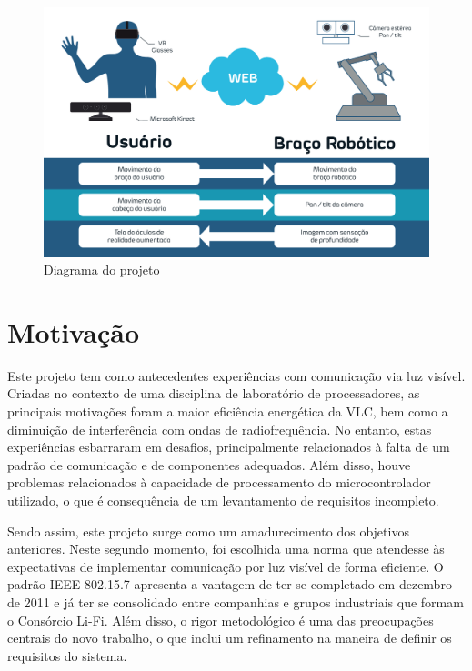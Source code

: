 	 
	
	
	
	
	\begin{figure}[ht!]
		\caption{\label{fig_diagrama}Diagrama do projeto}
		\begin{center}
		\includegraphics[width=\textwidth]{projectchart.pdf}	
		\end{center}
	\end{figure}
	

	
	\section*{Motivação}\label{sec-motivacao}
	
	Este projeto tem como antecedentes experiências com comunicação via luz visível. Criadas no contexto de uma disciplina de laboratório de processadores, as principais motivações foram a maior eficiência energética da VLC, bem como a diminuição de interferência com ondas de radiofrequência. No entanto, estas experiências esbarraram em desafios, principalmente relacionados à falta de um padrão de comunicação e de componentes adequados. Além disso, houve problemas relacionados à capacidade de processamento do microcontrolador utilizado, o que é consequência de um levantamento de requisitos incompleto.
	
	Sendo assim, este projeto surge como um amadurecimento dos objetivos anteriores. Neste segundo momento, foi escolhida uma norma que atendesse às expectativas de implementar comunicação por luz visível de forma eficiente. O padrão IEEE 802.15.7 apresenta a vantagem de ter se completado em dezembro de 2011 e já ter se consolidado entre companhias e grupos industriais que formam o Consórcio Li-Fi. Além disso, o rigor metodológico é uma das preocupações centrais do novo trabalho, o que inclui um refinamento na maneira de definir os requisitos do sistema.
	
